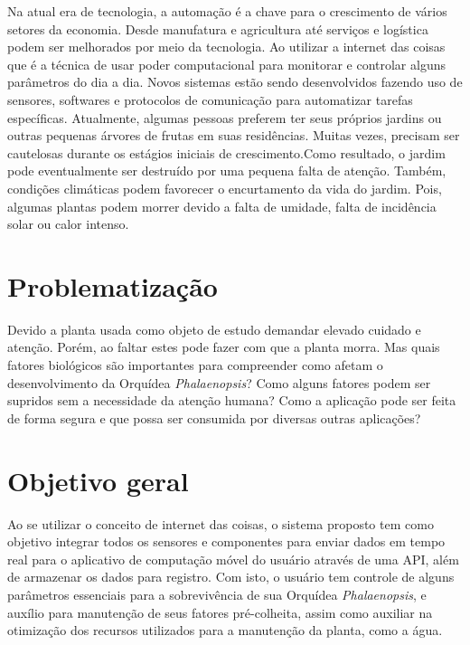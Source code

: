 \documentclass[conference]{IEEEtran}
\begin{document}
 Na atual era de tecnologia, a automação é a chave para o crescimento de vários setores da economia. Desde manufatura e agricultura até serviços e logística podem ser melhorados por meio da tecnologia. Ao utilizar a internet das coisas que é a técnica de usar poder computacional para monitorar e controlar alguns parâmetros do dia a dia. Novos sistemas estão sendo desenvolvidos fazendo uso de sensores, softwares e protocolos de comunicação para automatizar tarefas específicas. Atualmente, algumas pessoas preferem ter seus próprios jardins ou outras pequenas árvores de frutas em suas residências. Muitas vezes, precisam ser cautelosas durante os estágios iniciais de crescimento.Como resultado, o jardim pode eventualmente ser destruído por uma pequena falta de atenção. Também, condições climáticas podem favorecer o encurtamento da vida do jardim. Pois, algumas plantas podem morrer devido a falta de umidade, falta de incidência solar ou calor intenso.

\section{Problematização}
Devido a planta usada como objeto de estudo demandar elevado cuidado e atenção. Porém, ao faltar estes pode fazer com que a planta morra. Mas quais fatores biológicos  são importantes para compreender como afetam o desenvolvimento da Orquídea {\itshape{Phalaenopsis}}? Como  alguns fatores podem ser supridos sem a necessidade da atenção humana? Como a aplicação pode ser feita de forma segura e que possa ser consumida por diversas outras aplicações? \\

\section{Objetivo geral}
Ao se utilizar o conceito de internet das coisas, o sistema proposto tem como objetivo integrar todos os sensores e componentes para enviar dados em tempo real para o aplicativo de computação móvel do usuário através de uma API, além de armazenar os dados para registro. Com isto, o usuário tem controle de alguns parâmetros essenciais para a sobrevivência de sua Orquídea {\itshape{Phalaenopsis}}, e auxílio para manutenção de seus fatores pré-colheita, assim como auxiliar na otimização dos recursos utilizados para a manutenção da planta, como a água.
\end{document}
